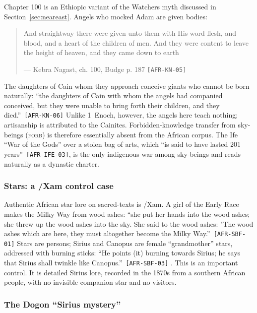 \documentclass[11pt,a4paper]{article}
\newcommand{\pid}[1]{\texttt{\small #1}}
\begin{document}
Chapter 100 is an Ethiopic variant of the Watchers myth discussed in Section~\ref{sec:neareast}. Angels who mocked Adam are given bodies: 
\begin{quote}\small And straightway there were given unto them with His word flesh, and blood, and a heart of the children of men. And they were content to leave the height of heaven, and they came down to earth\par\hfill{\footnotesize --- Kebra Nagast, ch. 100, Budge p. 187 \pid{[AFR-KN-05]}}\end{quote}
 The daughters of Cain whom they approach conceive giants who cannot be born naturally: \enquote{the daughters of Cain with whom the angels had companied conceived, but they were unable to bring forth their children, and they died.}~\pid{[AFR-KN-06]} Unlike 1~Enoch, however, the angels here teach nothing; artisanship is attributed to the Cainites. Forbidden-knowledge transfer from sky-beings (\textsc{forb}) is therefore essentially absent from the African corpus. The Ife ``War of the Gods'' over a stolen bag of arts, which \enquote{is said to have lasted 201 years}~\pid{[AFR-IFE-03]}, is the only indigenous war among sky-beings and reads naturally as a dynastic charter.

\subsubsection{Stars: a /Xam control case}

Authentic African star lore on sacred-texts is /Xam. A girl of the Early Race makes the Milky Way from wood ashes: \enquote{she put her hands into the wood ashes; she threw up the wood ashes into the sky. She said to the wood ashes: "The wood ashes which are here, they must altogether become the Milky Way.}~\pid{[AFR-SBF-01]} Stars are persons; Sirius and Canopus are female ``grandmother'' stars, addressed with burning sticks: \enquote{He points (it) burning towards Sirius; he says that Sirius shall twinkle like Canopus.}~\pid{[AFR-SBF-03]} \parencite{bleeklloyd1911}. This is an important control. It is detailed Sirius lore, recorded in the 1870s from a southern African people, with no invisible companion star and no visitors.

\subsubsection{The Dogon ``Sirius mystery''}
\end{document}
